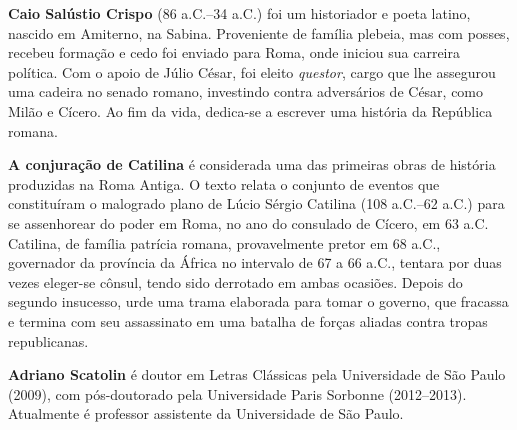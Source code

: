 \textbf{Caio Salústio Crispo} (86 a.C.--34 a.C.) foi um historiador e poeta
latino, nascido em Amiterno, na Sabina. Proveniente de família plebeia, mas com
posses, recebeu formação e cedo foi enviado para Roma, onde iniciou sua
carreira política. Com o apoio de Júlio César, foi eleito \emph{questor}, cargo que
lhe assegurou uma cadeira no senado romano, investindo contra adversários de
César, como Milão e Cícero. Ao fim da vida, dedica-se a escrever uma história da
República romana.


\textbf{A conjuração de Catilina} é considerada uma das primeiras obras de
história produzidas na Roma Antiga. O
texto relata o conjunto de eventos que constituíram o malogrado plano de Lúcio
Sérgio Catilina (108 a.C.--62 a.C.) para se assenhorear do poder em Roma, no
ano do consulado de Cícero, em 63 a.C. Catilina, de família patrícia romana,
provavelmente pretor em 68 a.C., governador da província da África no intervalo
de 67 a 66 a.C., tentara por duas vezes eleger-se cônsul, tendo sido derrotado
em ambas ocasiões. Depois do segundo insucesso, urde uma trama elaborada
para tomar o governo, que fracassa e termina com seu assassinato em uma batalha
de forças aliadas contra tropas republicanas. 


\textbf{Adriano Scatolin} é doutor em Letras Clássicas pela
Universidade de São Paulo (2009), com pós-doutorado pela Universidade Paris
 Sorbonne (2012--2013). Atualmente é professor assistente da Universidade de
São Paulo.

